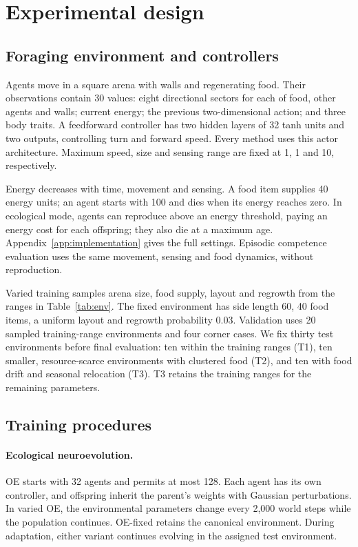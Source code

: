 \section{Experimental design}
\label{sec:methods}
\subsection{Foraging environment and controllers}
Agents move in a square arena with walls and regenerating food. Their observations contain 30 values: eight directional sectors for each of food, other agents and walls; current energy; the previous two-dimensional action; and three body traits. A feedforward controller has two hidden layers of 32 tanh units and two outputs, controlling turn and forward speed. Every method uses this actor architecture. Maximum speed, size and sensing range are fixed at 1, 1 and 10, respectively. 

Energy decreases with time, movement and sensing. A food item supplies 40 energy units; an agent starts with 100 and dies when its energy reaches zero. In ecological mode, agents can reproduce above an energy threshold, paying an energy cost for each offspring; they also die at a maximum age. Appendix~\ref{app:implementation} gives the full settings. Episodic competence evaluation uses the same movement, sensing and food dynamics, without reproduction.

Varied training samples arena size, food supply, layout and regrowth from the ranges in Table~\ref{tab:env}. The fixed environment has side length 60, 40 food items, a uniform layout and regrowth probability 0.03. Validation uses 20 sampled training-range environments and four corner cases. We fix thirty test environments before final evaluation: ten within the training ranges (T1), ten smaller, resource-scarce environments with clustered food (T2), and ten with food drift and seasonal relocation (T3). T3 retains the training ranges for the remaining parameters.



\subsection{Training procedures}
\label{sec:procedures}
\paragraph{Ecological neuroevolution.}
OE starts with 32 agents and permits at most 128. Each agent has its own controller, and offspring inherit the parent's weights with Gaussian perturbations. In varied OE, the environmental parameters change every 2,000 world steps while the population continues. OE-fixed retains the canonical environment. During adaptation, either variant continues evolving in the assigned test environment.


